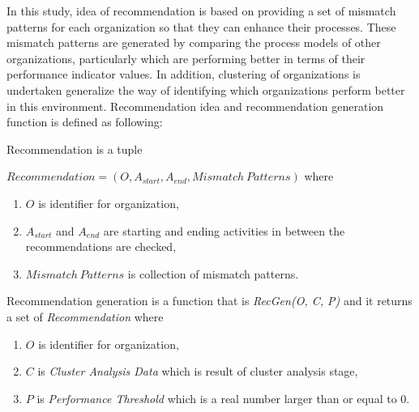 In this study, idea of recommendation is based on providing a set of mismatch patterns for each organization so that they can enhance their processes. These mismatch patterns are generated by comparing the process models of other organizations, particularly which are performing better in terms of their performance indicator values. In addition, clustering of organizations is undertaken generalize the way of identifying which organizations perform better in this environment. Recommendation idea and recommendation generation function is defined as following:
\theoremstyle{definition}
\begin{definition}
Recommendation is a tuple 

${Recommendation} = (O, A_{start}, A_{end}, Mismatch\ Patterns) $ where 
	\begin{enumerate}
	  \item $O$ is identifier for organization,
	  \item $A_{start}$ and $A_{end}$ are starting and ending activities in between the recommendations are checked,
	  \item $Mismatch\ Patterns$ is collection of mismatch patterns.
	\end{enumerate}
\end{definition}

\theoremstyle{definition}
\begin{definition}
Recommendation generation is a function that is \textit{RecGen(O, C, P)} and it returns a set of \textit{Recommendation} where
	\begin{enumerate}
	  \item $O$ is identifier for organization,
	  \item $C$ is \textit{Cluster Analysis Data} which is result of cluster analysis stage,
	  \item $P$ is \textit{Performance Threshold} which is a real number larger than or equal to 0.
	\end{enumerate}
\end{definition}

